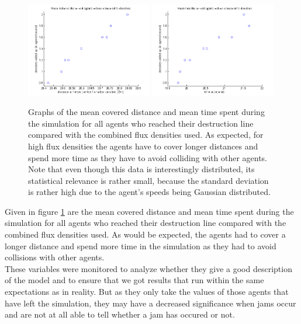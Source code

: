 \begin{figure}[h!]
	\centering
		\includegraphics[width=0.49\textwidth]{pictures/AMeanDistancesCompared.png}
		\includegraphics[width=0.49\textwidth]{pictures/AMeanTimeCompared.png}
	\caption{Graphs of the mean covered distance and mean time spent during the simulation for all agents who reached their destruction line compared with the combined flux densities used. As expected, for high flux densities the agents have to cover longer distances and spend more time as they have to avoid colliding with other agents. Note that even though this data is interestingly distributed, its statistical relevance is rather small, because the standard deviation is rather high due to the agent's speeds being Gaussian distributed.}
	\label{fig:ACompared}
\end{figure}

\noi Given in figure \ref{fig:ACompared} are the mean covered distance and mean time spent during the simulation for all agents who reached their destruction line compared with the combined flux densities used. As would be expected, the agents had to cover a longer distance and spend more time in the simulation as they had to avoid collisions with other agents.\\
These variables were monitored to analyze whether they give a good description of the model and to ensure that we got results that run within the same expectations as in reality. But as they only take the values of those agents that have left the simulation, they may have a decreased significance when jams occur and are not at all able to tell whether a jam has occured or not.

